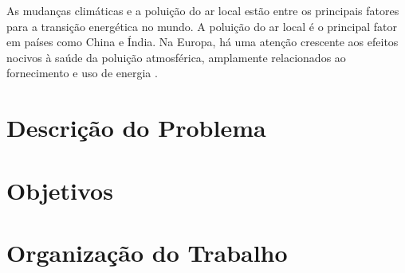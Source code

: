 As mudanças climáticas e a poluição do ar local estão entre os principais fatores para a transição energética no mundo. 
A poluição do ar local é o principal fator em países como China e Índia. 
Na Europa, há uma atenção crescente aos efeitos nocivos à saúde da poluição atmosférica, amplamente relacionados ao fornecimento e uso de energia \cite{Gielen2019}.





\section{Descrição do Problema}


\section{Objetivos}

\section{Organização do Trabalho}


